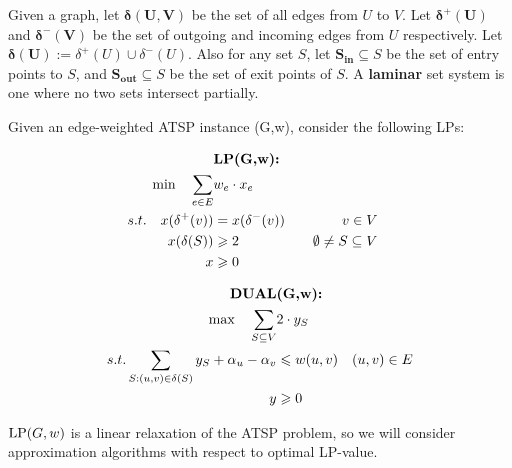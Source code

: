 \documentclass[./main.tex]{subfiles}
\begin{document}
	\begin{definition}
		Given a graph, let $\bm{\delta(U,V)}$ be the set of all edges from $U$ to $V$.
		Let $\bm{\delta^+(U)}$ and $\bm{\delta^-(V)}$ be the set of outgoing and incoming edges from $U$ respectively.
		Let $\bm{\delta(U)}:=\delta^+(U)\cup \delta^-(U)$. Also for any set $S$, let $\bm{S_{in}}\subseteq S$ be the set of entry points to $S$, and $\bm{S_{out}}\subseteq S$ be the set of exit points of $S$. A \textbf{laminar} set system is one where no two sets intersect partially.
	\end{definition}\vspace{4mm}

	\begin{definition}
		Given an edge-weighted ATSP instance (G,w), consider the following LPs:\\
		\begin{minipage}{0.40\textwidth}
			\begin{align*}
				&\textbf{\textup{LP}(G,w):}\\
				\min\quad\sum_{e\in E}&w_e\cdot x_e\\
				s.t.\quad x(\delta^+(v)) & = x(\delta^-(v))\quad & v\in V\quad                     \\
				x(\delta(S))             & \geqslant 2\quad           & \emptyset\neq S\subseteq V\quad \\
				x&\geqslant 0
			\end{align*}
		\end{minipage}
		\hfill\vline
		\begin{minipage}{0.65\textwidth}
			\begin{align*}
				\textbf{\textup{DUAL}}                                                 & \textbf{(G,w):}             \\
				\max\quad\sum_{S\subseteq V}                                  & 2\cdot y_S                  \\
				s.t.\sum_{S:(u,v)\in \delta(S)}y_S + \alpha_u - \alpha_v & \leqslant w(u,v)\quad (u,v)\in E \\
				y                                                             & \geqslant 0
			\end{align*}
		\end{minipage}
	\end{definition}
$\textup{LP}(G,w)$ is a linear relaxation of the ATSP problem, so we will consider approximation algorithms with respect to optimal LP-value.\vspace{4mm}
\end{document}
